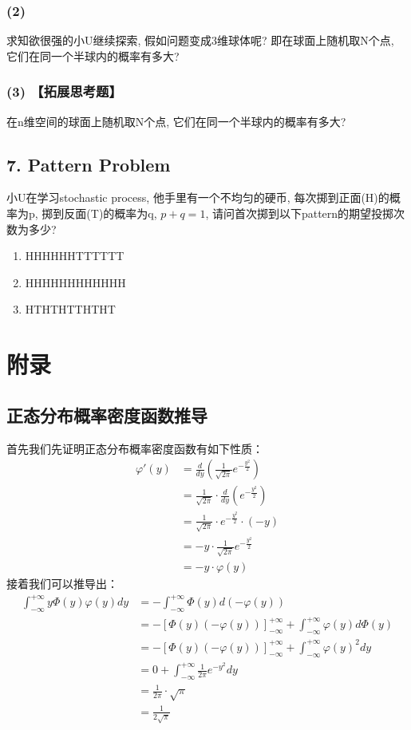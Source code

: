 \documentclass[UTF8]{ctexart}
\begin{document}
\subsubsection*{(2)}
求知欲很强的小U继续探索, 假如问题变成3维球体呢? 即在球面上随机取N个点, 它们在同一个半球内的概率有多大?

\subsubsection*{(3) 【拓展思考题】}
在n维空间的球面上随机取N个点, 它们在同一个半球内的概率有多大?

\subsection*{7. Pattern Problem}
小U在学习stochastic process, 他手里有一个不均匀的硬币, 每次掷到正面(H)的概率为p, 掷到反面(T)的概率为q, $p+q=1$, 请问首次掷到以下pattern的期望投掷次数为多少?
\begin{enumerate}
    \item HHHHHHTTTTTT
    \item HHHHHHHHHHHH
    \item HTHTHTTHTHT
\end{enumerate}



\section*{附录}

\subsection*{正态分布概率密度函数推导}
首先我们先证明正态分布概率密度函数有如下性质：
$$
\begin{align*}
    \varphi'(y) &= \frac{d}{dy}\left(\frac{1}{\sqrt{2\pi}}e^{-\frac{y^2}{2}}\right) \\
    &= \frac{1}{\sqrt{2\pi}} \cdot \frac{d}{dy}\left(e^{-\frac{y^2}{2}}\right) \\
    &= \frac{1}{\sqrt{2\pi}} \cdot e^{-\frac{y^2}{2}} \cdot \left(-y\right) \\
    &= -y \cdot \frac{1}{\sqrt{2\pi}}e^{-\frac{y^2}{2}} \\
    &= -y \cdot \varphi(y)
\end{align*}
$$
接着我们可以推导出：
$$
\begin{align*}
    \int_{-\infty}^{+\infty} y\Phi(y)\varphi(y)dy
    &= -\int_{-\infty}^{+\infty} \Phi(y)d(-\varphi(y)) \\
    &= -\left[\Phi(y)(-\varphi(y))\right]_{-\infty}^{+\infty} + \int_{-\infty}^{+\infty} \varphi(y)d\Phi(y) \\
    &= -\left[\Phi(y)(-\varphi(y))\right]_{-\infty}^{+\infty} + \int_{-\infty}^{+\infty} \varphi(y)^2 dy \\
    &= 0 + \int_{-\infty}^{+\infty} \frac{1}{2\pi}e^{-y^2} dy \\
    &= \frac{1}{2\pi} \cdot \sqrt{\pi} \\
    &= \frac{1}{2\sqrt{\pi}}
\end{align*}
$$
\end{document}
